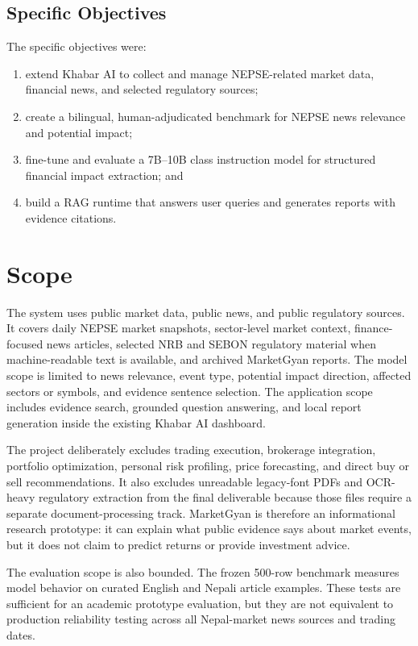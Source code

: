 \documentclass[12pt,a4paper]{report}
\begin{document}
\subsection{Specific Objectives}
The specific objectives were:
\begin{enumerate}[leftmargin=1.7em]
    \item extend Khabar AI to collect and manage NEPSE-related market data, financial news, and selected regulatory sources;
    \item create a bilingual, human-adjudicated benchmark for NEPSE news relevance and potential impact;
    \item fine-tune and evaluate a 7B--10B class instruction model for structured financial impact extraction; and
    \item build a RAG runtime that answers user queries and generates reports with evidence citations.
\end{enumerate}

\section{Scope}
The system uses public market data, public news, and public regulatory sources. It covers daily NEPSE market snapshots, sector-level market context, finance-focused news articles, selected NRB and SEBON regulatory material when machine-readable text is available, and archived MarketGyan reports. The model scope is limited to news relevance, event type, potential impact direction, affected sectors or symbols, and evidence sentence selection. The application scope includes evidence search, grounded question answering, and local report generation inside the existing Khabar AI dashboard.

The project deliberately excludes trading execution, brokerage integration, portfolio optimization, personal risk profiling, price forecasting, and direct buy or sell recommendations. It also excludes unreadable legacy-font PDFs and OCR-heavy regulatory extraction from the final deliverable because those files require a separate document-processing track. MarketGyan is therefore an informational research prototype: it can explain what public evidence says about market events, but it does not claim to predict returns or provide investment advice.

The evaluation scope is also bounded. The frozen 500-row benchmark measures model behavior on curated English and Nepali article examples. These tests are sufficient for an academic prototype evaluation, but they are not equivalent to production reliability testing across all Nepal-market news sources and trading dates.
\end{document}
